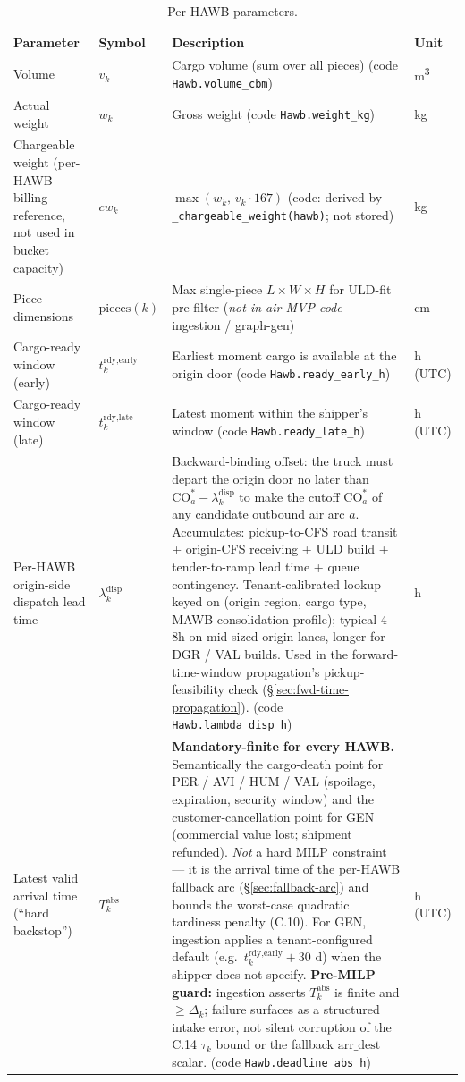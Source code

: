 \documentclass[11pt,a4paper]{article}
\theoremstyle{definition}
\begin{document}
\begin{table}[H]
\centering
\caption{Per-HAWB parameters.}
\label{tab:hawb-params}
\begin{tabular}{p{3.5cm}p{2.2cm}p{6.5cm}p{1.5cm}}
\toprule
Parameter & Symbol & Description & Unit \\
\midrule
Volume & $v_k$ & Cargo volume (sum over all pieces) (code \texttt{Hawb.volume\_cbm}) & m\textsuperscript{3} \\
Actual weight & $w_k$ & Gross weight (code \texttt{Hawb.weight\_kg}) & kg \\
Chargeable weight (per-HAWB billing reference, not used in bucket capacity) & $cw_k$ & $\max(w_k,\, v_k \cdot 167)$ (code: derived by \texttt{\_chargeable\_weight(hawb)}; not stored) & kg \\
Piece dimensions & $\text{pieces}(k)$ & Max single-piece $L \times W \times H$ for ULD-fit pre-filter (\emph{not in air MVP code} --- ingestion / graph-gen) & cm \\
Cargo-ready window (early) & $t_k^{\text{rdy,early}}$ & Earliest moment cargo is available at the origin door (code \texttt{Hawb.ready\_early\_h}) & h (UTC) \\
Cargo-ready window (late) & $t_k^{\text{rdy,late}}$ & Latest moment within the shipper's window (code \texttt{Hawb.ready\_late\_h}) & h (UTC) \\
Per-HAWB origin-side dispatch lead time & $\lambda^{\text{disp}}_k$ & Backward-binding offset: the truck must depart the origin door no later than $\text{CO}_a^* - \lambda^{\text{disp}}_k$ to make the cutoff $\text{CO}_a^*$ of any candidate outbound air arc $a$. Accumulates: pickup-to-CFS road transit + origin-CFS receiving + ULD build + tender-to-ramp lead time + queue contingency. Tenant-calibrated lookup keyed on (origin region, cargo type, MAWB consolidation profile); typical 4--8h on mid-sized origin lanes, longer for DGR / VAL builds. Used in the forward-time-window propagation's pickup-feasibility check (\S\ref{sec:fwd-time-propagation}). (code \texttt{Hawb.lambda\_disp\_h}) & h \\
Latest valid arrival time (``hard backstop'') & $T_k^{\text{abs}}$ & \textbf{Mandatory-finite for every HAWB.} Semantically the cargo-death point for PER / AVI / HUM / VAL (spoilage, expiration, security window) and the customer-cancellation point for GEN (commercial value lost; shipment refunded). \emph{Not} a hard MILP constraint --- it is the arrival time of the per-HAWB fallback arc (\S\ref{sec:fallback-arc}) and bounds the worst-case quadratic tardiness penalty (C.10). For GEN, ingestion applies a tenant-configured default (e.g.\ $t_k^{\text{rdy,early}} + 30$ d) when the shipper does not specify. \textbf{Pre-MILP guard:} ingestion asserts $T_k^{\text{abs}}$ is finite and $\geq \Delta_k$; failure surfaces as a structured intake error, not silent corruption of the C.14 $\tau_k$ bound or the fallback $\text{arr\_dest}$ scalar. (code \texttt{Hawb.deadline\_abs\_h}) & h (UTC) \\

\end{tabular}
\end{table}
\end{document}
